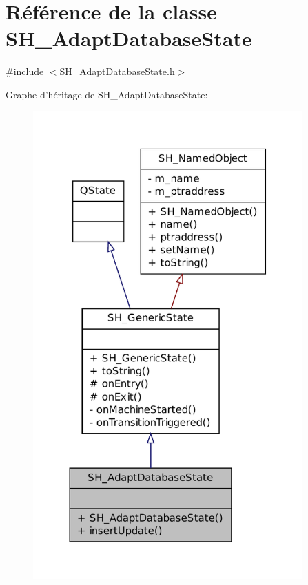 \hypertarget{classSH__AdaptDatabaseState}{\section{Référence de la classe S\-H\-\_\-\-Adapt\-Database\-State}
\label{classSH__AdaptDatabaseState}
}


{\ttfamily \#include $<$S\-H\-\_\-\-Adapt\-Database\-State.\-h$>$}



Graphe d'héritage de S\-H\-\_\-\-Adapt\-Database\-State\-:
\nopagebreak
\begin{figure}[H]
\begin{center}
\leavevmode
\includegraphics[width=293pt]{classSH__AdaptDatabaseState__inherit__graph}
\end{center}
\end{figure}


